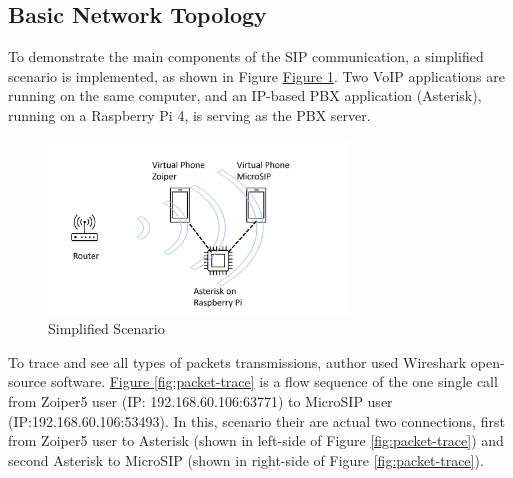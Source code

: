 \subsection{Basic Network Topology}
To demonstrate the main components of the SIP communication, a simplified scenario is implemented, as shown in Figure  \hyperref[fig:topo]{Figure \ref{fig:topo}}. Two VoIP applications are running on the same computer, and an IP-based PBX application (Asterisk), running on a Raspberry Pi 4, is serving as the PBX server.

\begin{figure}[htbp]
	\centerline{\includegraphics[width=8cm]{Images/experiment/exp1.png}}
	\caption{Simplified Scenario}
	\label{fig:topo}
\end{figure}

To trace and see all types of packets transmissions, author used Wireshark open-source software. \hyperref[fig:packet-trace]{Figure \ref{fig:packet-trace}} is a flow sequence of the one single call from Zoiper5 user (IP: 192.168.60.106:63771) to MicroSIP user (IP:192.168.60.106:53493). In this, scenario their are actual two connections, first from Zoiper5 user to Asterisk (shown in left-side of Figure \ref{fig:packet-trace}) and second Asterisk to MicroSIP (shown in right-side of Figure \ref{fig:packet-trace}).

